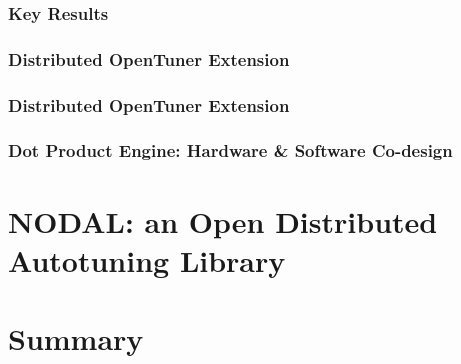 \documentclass[10pt, compress, aspectratio=169]{beamer}
\begin{document}
\begin{frame}
    \frametitle{Key Results}
\end{frame}

\begin{frame}
    \frametitle{Distributed OpenTuner Extension}
\end{frame}

\begin{frame}
    \frametitle{Distributed OpenTuner Extension}
\end{frame}

\begin{frame}
    \frametitle{Dot Product Engine: Hardware \& Software Co-design}
\end{frame}

\section{NODAL: an Open Distributed Autotuning Library}

\begin{frame}
    \frametitle{}
\end{frame}

\section{Summary}

\begin{frame}
    \frametitle{}
\end{frame}

\maketitle
\end{document}
